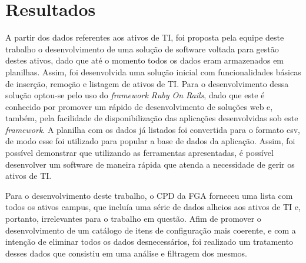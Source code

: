 \chapter{Resultados}
A partir dos dados referentes aos ativos de TI, foi proposta pela equipe deste trabalho o desenvolvimento de uma solução de software voltada para gestão destes ativos, dado que até o momento todos os dados eram armazenados em planilhas. Assim, foi desenvolvida uma solução inicial com funcionalidades básicas de inserção, remoção e listagem de ativos de TI. Para o desenvolvimento dessa solução optou-se pelo uso do \textit{framework Ruby On Rails}, dado que este é conhecido por promover um rápido de desenvolvimento de soluções web e, também, pela facilidade de disponibilização das aplicações desenvolvidas sob este \textit{framework}. A planilha com os dados já listados foi convertida para o formato csv, de modo esse foi utilizado para popular a base de dados da aplicação. Assim, foi possível demonstrar que utilizando as ferramentas apresentadas, é possível desenvolver um software de maneira rápida que atenda a necessidade de gerir os ativos de TI.

Para o desenvolvimento deste trabalho, o CPD da FGA forneceu uma lista com todos os ativos campus, que incluía uma série de dados alheios aos ativos de TI e, portanto, irrelevantes para o trabalho em questão. Afim de promover o desenvolvimento de um catálogo de itens de configuração mais coerente, e com a intenção de eliminar todos os dados desnecessários, foi realizado um tratamento desses dados que consistiu em uma análise e filtragem dos mesmos.
